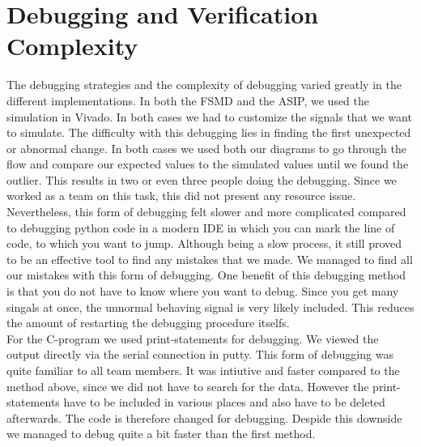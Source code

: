 \documentclass[conference]{IEEEtran}
\begin{document}
\section{Debugging and Verification Complexity}\label{sec:debugging}
The debugging strategies and the complexity of debugging varied greatly in the different implementations. In both the FSMD and the ASIP, we used the simulation in Vivado. In both cases we had to customize the signals that we want to simulate. The difficulty with this debugging lies in finding the first unexpected or abnormal change. In both cases we used both our diagrams to go through the flow and compare our expected values to the simulated values until we found the outlier. This results in two or even three people doing the debugging. Since we worked as a team on this task, this did not present any resource issue. Nevertheless, this form of debugging felt slower and more complicated compared to debugging python code in a modern IDE in which you can mark the line of code, to which you want to jump. Although being a slow process, it still proved to be an effective tool to find any mistakes that we made. We managed to find all our mistakes with this form of debugging. One benefit of this debugging method is that you do not have to know where you want to debug. Since you get many singals at once, the unnormal behaving signal is very likely included. This reduces the amount of restarting the debugging procedure itselfs. \\
For the C-program we used print-statements for debugging. We viewed the output directly via the serial connection in putty. This form of debugging was quite familiar to all team members. It was intiutive and faster compared to the method above, since we did not have to search for the data. However the print-statements have to be included in various places and also have to be deleted afterwards. The code is therefore changed for debugging. Despide this downside we managed to debug quite a bit faster than the first method. \\
\end{document}
